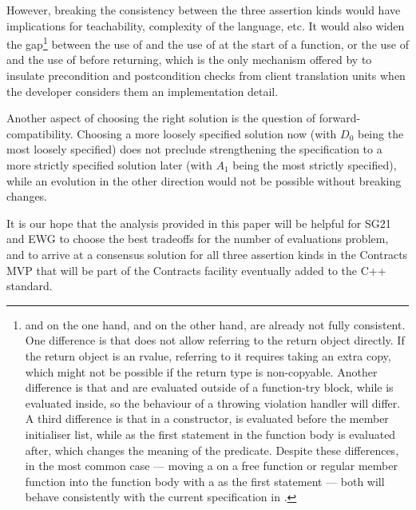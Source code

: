 However, breaking the consistency between the three assertion kinds would have implications for teachability, complexity of the language, etc. It would also widen the gap\footnote{ and  on the one hand, and  on the other hand, are already not fully consistent. One difference is that  does not allow referring to the return object directly. If the return object is an rvalue, referring to it requires taking an extra copy, which might not be possible if the return type is non-copyable. Another difference is that  and  are evaluated outside of a function-try block, while  is evaluated inside, so the behaviour of a throwing violation handler will differ. A third difference is that in a constructor,  is evaluated before the member initialiser list, while  as the first statement in the function body is evaluated after, which changes the meaning of the predicate. Despite these differences, in the most common case --- moving a  on a free function or regular member function into the function body with a  as the first statement --- both will behave consistently with the current specification in \cite{P2900R6}.} between the use of  and the use of  at the start
of a function, or the use of  and the use of  before returning, which is the only mechanism offered by \cite{P2900R6} to insulate precondition and postcondition checks from client translation units when the developer considers them an implementation detail.

Another aspect of choosing the right solution is the question of forward-compatibility. Choosing a more loosely specified solution now (with $D_0$ being the most loosely specified) does not preclude strengthening the specification to a more strictly specified solution later (with $A_1$ being the most strictly specified), while an evolution in the other direction would not be possible without breaking changes.

It is our hope that the analysis provided in this paper will be helpful for SG21 and EWG to choose the best tradeoffs for the number of evaluations problem, and to arrive at a consensus solution for all three assertion kinds in the Contracts MVP that will be part of the Contracts facility eventually added to the C++ standard.


